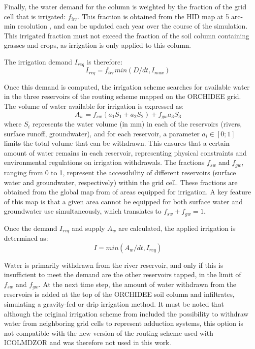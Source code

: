 Finally, the water demand for the column is weighted by the fraction of the grid cell that is irrigated: $f_{irr}$. This fraction is obtained from the HID map at 5 arc-min resolution \citep{siebert_quantifying_2010}, and can be updated each year over the course of the simulation.
This irrigated fraction must not exceed the fraction of the soil column containing grasses and crops, as irrigation is only applied to this column.

The irrigation demand $I_{req}$ is therefore:
\begin{equation}
    I_{req} = f_{irr} min(D/dt, I_{max})
\end{equation}

Once this demand is computed, the irrigation scheme searches for available water in the three reservoirs of the routing scheme mapped on the ORCHIDEE grid.
The volume of water available for irrigation is expressed as:
\begin{equation}
    A_w = f_{sw} (a_1 S_1 + a_2 S_2)+ f_{gw}a_3 S_3
\end{equation}
where $S_i$ represents the water volume (in mm) in each of the reservoirs (rivers, surface runoff, groundwater), and for each reservoir, a parameter $a_i \in [0;1]$ limits the total volume that can be withdrawn. This ensures that a certain amount of water remains in each reservoir, representing physical constraints and environmental regulations on irrigation withdrawals.
The fractions $f_{sw}$ and $f_{gw}$, ranging from 0 to 1, represent the accessibility of different reservoirs (surface water and groundwater, respectively) within the grid cell. These fractions are obtained from the global map from \citet{siebert_groundwater_2010} of areas equipped for irrigation. A key feature of this map is that a given area cannot be equipped for both surface water and groundwater use simultaneously, which translates to $f_{sw} + f_{gw} =1$.

Once the demand $I_{req}$ and supply $A_w$ are calculated, the applied irrigation is determined as:
\begin{equation}
    I = min(A_w/dt, I_{req})
\end{equation}

Water is primarily withdrawn from the river reservoir, and only if this is insufficient to meet the demand are the other reservoirs tapped, in the limit of $f_{sw}$ and $f_{gw}$.
At the next time step, the amount of water withdrawn from the reservoirs is added at the top of the ORCHIDEE soil column and infiltrates, simulating a gravity-fed or drip irrigation method.
It must be noted that although the original irrigation scheme from \citet{arboleda-obando_validation_2024} included the possibility to withdraw water from neighboring grid cells to represent adduction systems, this option is not compatible with the new version of the routing scheme used with ICOLMDZOR and was therefore not used in this work.

